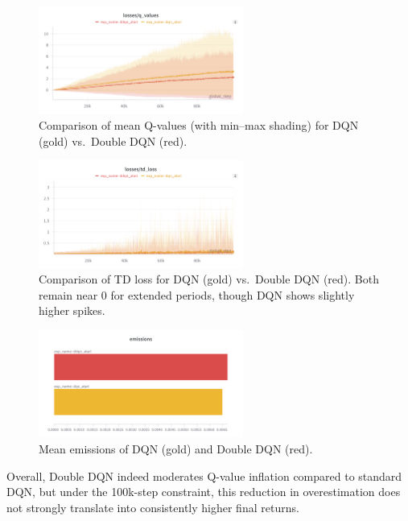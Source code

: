 \begin{figure}
	\centering
	\includegraphics[width=0.6\textwidth]{figures/ddqn/comparison_losses_q_values_dqn_ddqn.png}
	\caption{Comparison of mean Q-values (with min--max shading) for DQN (gold) vs.\ Double DQN (red).}
	\label{fig:dqn_vs_ddqn_qvalues}
\end{figure}

\begin{figure}
	\centering
	\includegraphics[width=0.6\textwidth]{figures/ddqn/comparison_losses_td_loss_dqn_ddqn.png}
	\caption{Comparison of TD loss for DQN (gold) vs.\ Double DQN (red). 
		Both remain near 0 for extended periods, though DQN shows slightly higher spikes.}
	\label{fig:dqn_vs_ddqn_td_loss}
\end{figure}


\begin{figure}
	\centering
	\includegraphics[width=0.6\textwidth]{figures/ddqn/emissions_dqn_ddqn.png}
	\caption{Mean emissions of DQN (gold) and Double DQN (red).}
	\label{fig:emissions_dqn_ddqn}
\end{figure}

Overall, Double DQN indeed moderates Q-value inflation compared to standard DQN, 
but under the 100k-step constraint, this reduction in overestimation does not strongly translate 
into consistently higher final returns.

